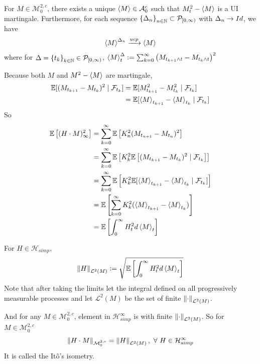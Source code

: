 \documentclass[a4paper,12pt]{article}
\begin{document}
\begin{itemize}
  \begin{thm}
    For $M \in \mathcal{M}_0^{2,c}$, there exists a unique $\left\langle M \right\rangle \in \mathcal{A}_0^c$ such that $M_t^2 - \left\langle M \right\rangle$ is a UI martingale. Furthermore, for each sequence $\left\{\Delta_n\right\}_{n \in \mathbb{N}} \subset \mathcal{P}_{[0,\infty)}$ with $\Delta_n \rightarrow Id$, we have
    \begin{equation*}
      \left\langle M \right\rangle^{\Delta_n} \xrightarrow{ucp} \left\langle M \right\rangle
    \end{equation*}
    where for $\Delta = \left\{t_k\right\}_{k\in \mathbb{N}} \in \mathcal{P}_{[0,\infty)}$, $\left\langle M \right\rangle^{\Delta}_t \vcentcolon= \sum_{k=0}^{\infty}\left(M_{t_{k+1} \wedge t} - M_{t_k \wedge t}\right)^2$
  \end{thm}
  Because both $M$ and $M^2 - \left\langle M \right\rangle$ are martingale,
  \begin{equation*}
    \begin{split}
      \mathbb{E}[(M_{t_{k+1}} - M_{t_k})^2 \mid \mathcal{F}_{t_k}] &= \mathbb{E}[M_{t_{k+1}}^2 - M_{t_k}^2 \mid \mathcal{F}_{t_k}] \\
      &= \mathbb{E}[\left\langle M \right\rangle_{t_{k+1}} - \left\langle M \right\rangle_{t_k} \mid \mathcal{F}_{t_k}]
    \end{split}
  \end{equation*}
  So
  \begin{equation*}
    \begin{split}
      \mathbb{E}\left[(H \cdot M)_{\infty}^2\right] &= \sum_{k=0}^{\infty}\mathbb{E}\left[K_n^2(M_{t_{n+1}} - M_{t_n})^2\right] \\
      &= \sum_{k=0}^{\infty}\mathbb{E}\left[K_k^2\mathbb{E}\left[(M_{t_{k+1}} - M_{t_k})^2 \mid \mathcal{F}_{t_k}\right]\right] \\
      &= \sum_{k=0}^{\infty}\mathbb{E}\left[K_k^2\mathbb{E}[\left\langle M \right\rangle_{t_{k+1}} - \left\langle M \right\rangle_{t_k} \mid \mathcal{F}_{t_k}]\right] \\
      &= \mathbb{E}\left[\sum_{k=0}^{\infty}K_k^2(\left\langle M \right\rangle_{t_{k+1}} - \left\langle M \right\rangle_{t_k})\right] \\
      &= \mathbb{E}\left[\int_0^{\infty} H_t^2 d \left\langle M \right\rangle_t\right]
    \end{split}
  \end{equation*} 

  \noindent For $H \in \mathcal{H}_{simp}$,
  \begin{equation*}
    \left\lVert H\right\lVert_{\mathcal{L}^2(M)} \vcentcolon= \sqrt{\mathbb{E}\left[\int_0^{\infty}H_t^2 d\left\langle M \right\rangle_t\right]}
  \end{equation*}
  Note that after taking the limits let the integral defined on all progressively measurable processes and let $\mathcal{L}^2(M)$ be the set of finite $\left\lVert\cdot\right\lVert_{\mathcal{L}^2(M)}$.

  \noindent And for any $M \in \mathcal{M}_0^{2,c}$, element in $\mathcal{H}_{simp}^{\infty}$ is with finite $\left\lVert\cdot\right\lVert_{\mathcal{L}^2(M)}$. So for $M \in \mathcal{M}_0^{2,c}$
  \begin{equation*}
    \left\lVert H \cdot M\right\lVert_{\mathcal{M}_0^{2,c}} = \left\lVert H\right\lVert_{\mathcal{L}^2(M)},~\forall~H \in \mathcal{H}_{simp}^{\infty}
  \end{equation*}
  It is called the It\^o's isometry.


\end{itemize}
\end{document}
